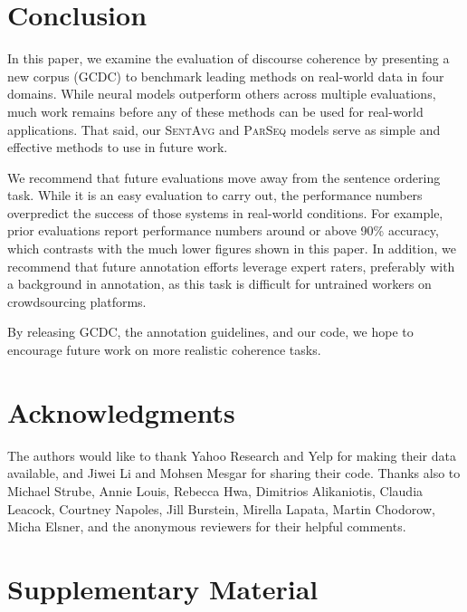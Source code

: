 \documentclass[11pt,a4paper]{article}
\newcommand \parseq{\textsc{ParSeq}\xspace}
\newcommand \sentavg{\textsc{SentAvg}\xspace}
\newcommand \dataset{\textsc{GCDC}\xspace}
\begin{document}
\section{Conclusion}
\label{sec:conclusion}
In this paper, we examine the evaluation of discourse coherence by presenting a new corpus (\dataset) to benchmark leading methods on real-world data in four domains.  While neural models outperform others across multiple evaluations, much work remains before any of these methods can be used for real-world applications. 
That said, our \sentavg and \parseq models serve as simple and effective methods to use in future work.

We recommend that future evaluations move away from the sentence ordering task.  While it is an easy evaluation to carry out, the performance numbers overpredict the success of those systems in real-world conditions.  For example, prior evaluations \cite{nguyen-joty:2017:ACL,li-jurafsky:2017:EMNLP} report performance numbers around or above 90\% accuracy, which contrasts with the much lower figures shown in this paper.
In addition, we recommend that future annotation efforts leverage expert raters, preferably with a background in annotation, as this task is difficult for untrained workers on crowdsourcing platforms.

By releasing \dataset, the annotation guidelines, and our code, we hope to encourage future work on more realistic coherence tasks.













\section*{Acknowledgments}

The authors would like to thank Yahoo Research and Yelp for making their data available, and Jiwei Li and Mohsen Mesgar for sharing their code. Thanks also to Michael Strube, Annie Louis, Rebecca Hwa, Dimitrios Alikaniotis, Claudia Leacock, Courtney Napoles, Jill Burstein, Mirella Lapata, Martin Chodorow, Micha Elsner, and the anonymous reviewers for their helpful comments. 




\newpage
\appendix
\section{Supplementary Material}
\label{sec:supplementary}
\end{document}
